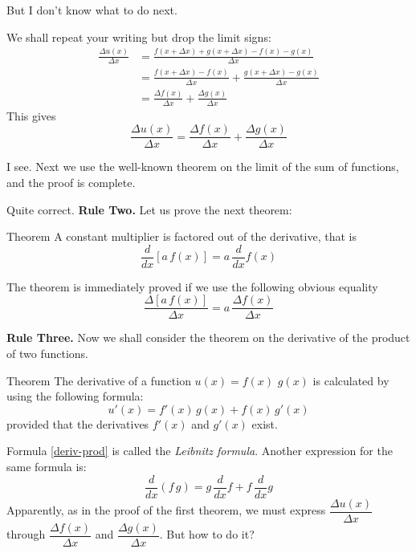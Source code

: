 But I don't know what to do next. 

\athr We shall repeat your writing but drop the limit signs:
\begin{align*}%
\frac{\Delta u(x)}{ \Delta x} & =  \frac{f (x + \Delta x) + g (x + \Delta x) - f(x) - g(x)}{ \Delta x} \\
& =  \frac{f (x + \Delta x)  - f(x) }{ \Delta x} +  \frac{g (x + \Delta x) - g(x)}{ \Delta x} \\
& = \frac{\Delta f(x)}{ \Delta x}  + \frac{\Delta g(x)}{ \Delta x} 
\end{align*}
This gives
\begin{equation*}%
\frac{\Delta u(x)}{ \Delta x}  = \frac{\Delta f(x)}{ \Delta x}  + \frac{\Delta g(x)}{ \Delta x} 
\end{equation*}

\rdr I see. Next we use the well-known theorem on the limit of the sum of functions, and the proof is complete. 

\athr Quite correct. \textbf{Rule Two.} Let us prove the
next theorem:
\begin{mytheo}{Theorem}
 A constant multiplier is factored out of the derivative, that is
\begin{equation}%
\frac{d}{dx} \left[a \, f(x) \right] =a \, \frac{d}{dx} f(x)
\label{deriv-const}
\end{equation}
\end{mytheo}
The theorem is immediately proved if we use the following obvious equality
\begin{equation*}%
\frac{\Delta \left[a \, f(x) \right]}{ \Delta x}  = a \, \frac{\Delta f(x)}{ \Delta x} 
\end{equation*}

\textbf{Rule Three.} Now we shall consider the theorem on the derivative of the product of two functions.
\begin{mytheo}{Theorem}
The derivative of a function $u (x) = f (x) \, \, g (x)$ is calculated
by using the following formula:
\begin{equation}%
 u' (x) = f' (x) \, g (x) + f (x) \, g' (x)
 \label{deriv-prod}
\end{equation}
provided that the derivatives $f' (x)$ and $g' (x)$ exist. 
\end{mytheo}
Formula \eqref{deriv-prod} is called the \emph{Leibnitz formula}. Another expression for the same formula is:
\begin{equation*}%
\frac{d}{dx} (f \, g) = g \, \frac{d}{dx} f  +  f \, \frac{d}{dx} g 
\end{equation*}
\rdr Apparently, as in the proof of the first theorem, we must express $\dfrac{\Delta u (x)}{\Delta x}$ through $\dfrac{\Delta f (x)}{\Delta x}$ and $\dfrac{\Delta g (x)}{\Delta x}$. But how to do it? 

